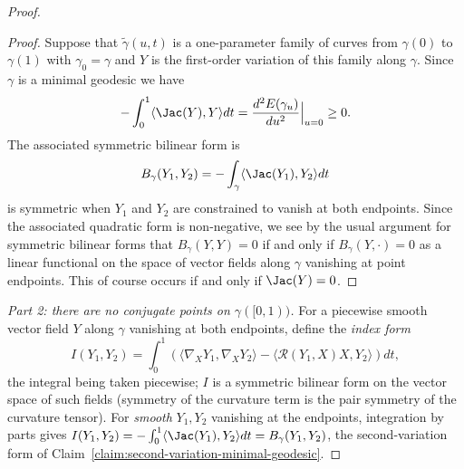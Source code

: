 \begin{proof}
\begin{proof}
\sketch
{}
Suppose that $\tilde\gamma(u,t)$ is a one-parameter family of curves
from $\gamma(0)$ to $\gamma(1)$ with $\gamma_0=\gamma$ and $Y$ is
the first-order variation of this family along $\gamma$.  Since
$\gamma$ is a minimal geodesic we have
$$-\int_0^1\langle \Jac(Y),Y\rangle dt=\frac{d^2E(\gamma_u)}{du^2}\Bigl|_{u=0}\Bigr.\ge 0.$$
 The associated symmetric bilinear form is
$$B_\gamma(Y_1,Y_2)=-\int_\gamma\langle \Jac(Y_1),Y_2\rangle dt$$
is symmetric when $Y_1$ and $Y_2$ are constrained to vanish at both
endpoints. Since the associated quadratic form is non-negative, we
see by the usual argument for symmetric bilinear forms that
$B_\gamma(Y,Y)=0$ if and only if $B_\gamma(Y,\cdot)=0$ as a linear
functional on the space of vector fields along $\gamma$ vanishing at
point endpoints. This of course occurs if and only if $\Jac(Y)=0$.
\end{proof}


\emph{Part 2: there are no conjugate points on $\gamma([0,1))$.}
For a piecewise smooth vector field $Y$ along $\gamma$ vanishing at
both endpoints, define the \emph{index form}
$$I(Y_1,Y_2)=\int_0^1\left(\langle\nabla_XY_1,\nabla_XY_2\rangle
-\langle{\mathcal R}(Y_1,X)X,Y_2\rangle\right)dt,$$
the integral being taken piecewise; $I$ is a symmetric bilinear form
on the vector space of such fields (symmetry of the curvature term
is the pair symmetry of the curvature tensor). For \emph{smooth}
$Y_1,Y_2$ vanishing at the endpoints, integration by parts gives
$I(Y_1,Y_2)=-\int_0^1\langle \Jac(Y_1),Y_2\rangle
dt=B_\gamma(Y_1,Y_2)$, the second-variation form of
Claim~\ref{claim:second-variation-minimal-geodesic}.


\end{proof}
